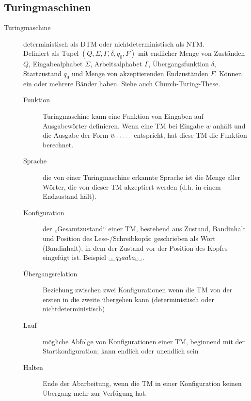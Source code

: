 \subsection{Turingmaschinen}
    \begin{description}
        \item[Turingmaschine] deterministisch als DTM oder nichtdeterministisch als NTM. \\
            Definiert als Tupel $(Q,\Sigma,\Gamma,\delta,q_0,F)$ mit endlicher Menge von Zuständen $Q$, Eingabealphabet $\Sigma$, Arbeitsalphabet $\Gamma$, Übergangsfunktion $\delta$, Startzustand $q_0$ und Menge von akzeptierenden Endzuständen $F$. Können ein oder mehrere Bänder haben. Siehe auch Church-Turing-These.  

            \begin{description}
                \item[Funktion] Turingmaschine kann eine Funktion von Eingaben auf Ausgabewörter definieren. Wenn eine TM bei Eingabe $w$ anhält und die Ausgabe der Form $v\blank\blank\dots$ entspricht, hat diese TM die Funktion berechnet.
                \item[Sprache] die von einer Turingmaschine erkannte Sprache ist die Menge aller Wörter, die von dieser TM akzeptiert werden (d.h. in einem Endzustand hält).

                \item[Konfiguration]
                    der „Gesamtzustand“ einer TM, bestehend aus Zustand, Bandinhalt und Position des Lese-/Schreibkopfs;
                    geschrieben als Wort (Bandinhalt), in dem der Zustand vor der Position des Kopfes eingefügt ist. Beispiel $ \blank\blank q_0aaba \blank\blank$.
                \item[Übergangsrelation]
                    Beziehung zwischen zwei Konfigurationen wenn die TM von der ersten in die zweite übergehen kann
                    (deterministisch oder nichtdeterministisch)
                \item[Lauf] mögliche Abfolge von Konfigurationen einer TM, beginnend mit der Startkonfiguration; kann endlich oder unendlich sein
                \item[Halten] Ende der Abarbeitung, wenn die TM in einer Konfiguration keinen Übergang mehr zur Verfügung hat.


\end{description}
\end{description}
